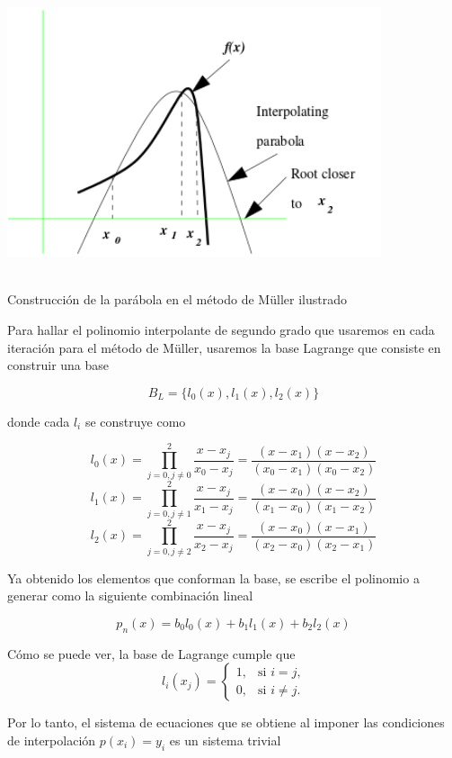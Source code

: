 \documentclass[11pt]{article}
\begin{document}
\begin{center}
    \includegraphics[keepaspectratio, width=11cm]{muller.png}
    \caption \tiny{\\ Construcción de la parábola en el método de Müller ilustrado}
\end{center}  
\vspace{0.75cm}

Para hallar el polinomio interpolante de segundo grado que usaremos en cada iteración para el método de Müller, usaremos la base Lagrange que consiste en construir una base 

$$ B_L = \{l_0(x),l_1(x),l_2(x)\}$$

donde cada $l_i$ se construye como

$$l_0(x) = \prod_{j=0,j\neq0}^{2} \frac{x-x_j}{x_0 - x_j} =
	    \frac{(x-x_1)(x-x_2)}{(x_0 - x_1)(x_0 - x_2)} 
$$
$$l_1(x)  = \prod_{j=0,j\neq1}^{2} \frac{x-x_j}{x_1 - x_j} = 
	    \frac{(x-x_0)(x-x_2)}{(x_1 - x_0)(x_1 - x_2)} 
$$
$$l_2(x)  = \prod_{j=0,j\neq2}^{2} \frac{x-x_j}{x_2 - x_j} =
	    \frac{(x-x_0)(x-x_1)}{(x_2 - x_0)(x_2 - x_1)}
$$

Ya obtenido los elementos que conforman la base, se escribe el polinomio a generar como la siguiente combinación lineal

$$p_n(x) = b_0l_0(x) + b_1l_1(x) + b_2l_2(x)$$

Cómo se puede ver, la base de Lagrange cumple que 
$$
l_i(x_j)=\begin{cases}
    1, & \mbox{si $i=j$,}\\
    0, & \mbox{si $i\neq j$.}
\end{cases}
$$

Por lo tanto, el sistema de ecuaciones que se obtiene al imponer las condiciones de interpolación $p(x_i) = y_i$ es un sistema trivial
\end{document}
